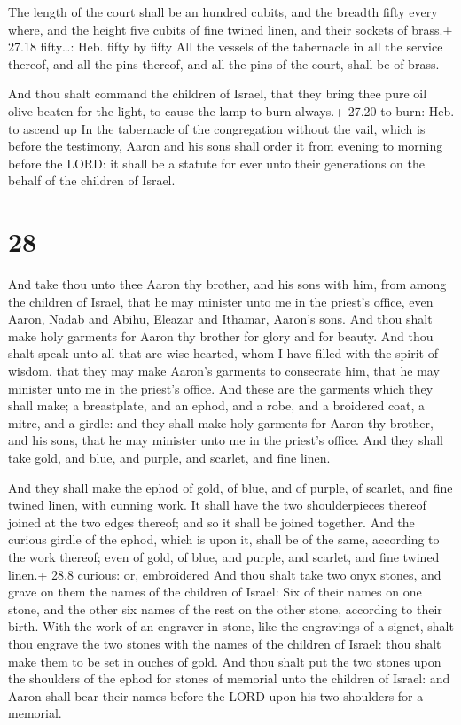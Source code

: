  The length of the court shall be an hundred cubits, and
the breadth fifty every where, and the height five cubits of fine twined
linen, and their sockets of brass.+ 27.18 fifty\ldots: Heb. fifty by
fifty  All the vessels of the tabernacle in all the service
thereof, and all the pins thereof, and all the pins of the court, shall
be of brass.

 And thou shalt command the children of Israel, that they
bring thee pure oil olive beaten for the light, to cause the lamp to
burn always.+ 27.20 to burn: Heb. to ascend up  In the
tabernacle of the congregation without the vail, which is before the
testimony, Aaron and his sons shall order it from evening to morning
before the LORD: it shall be a statute for ever unto their generations
on the behalf of the children of Israel.

\hypertarget{section-27}{%
\section{28}\label{section-27}}

 And take thou unto thee Aaron thy brother, and his sons
with him, from among the children of Israel, that he may minister unto
me in the priest's office, even Aaron, Nadab and Abihu, Eleazar and
Ithamar, Aaron's sons.  And thou shalt make holy garments
for Aaron thy brother for glory and for beauty.  And thou
shalt speak unto all that are wise hearted, whom I have filled with the
spirit of wisdom, that they may make Aaron's garments to consecrate him,
that he may minister unto me in the priest's office.  And
these are the garments which they shall make; a breastplate, and an
ephod, and a robe, and a broidered coat, a mitre, and a girdle: and they
shall make holy garments for Aaron thy brother, and his sons, that he
may minister unto me in the priest's office.  And they shall
take gold, and blue, and purple, and scarlet, and fine linen.

 And they shall make the ephod of gold, of blue, and of
purple, of scarlet, and fine twined linen, with cunning work.
 It shall have the two shoulderpieces thereof joined at the
two edges thereof; and so it shall be joined together.  And
the curious girdle of the ephod, which is upon it, shall be of the same,
according to the work thereof; even of gold, of blue, and purple, and
scarlet, and fine twined linen.+ 28.8 curious: or, embroidered
 And thou shalt take two onyx stones, and grave on them the
names of the children of Israel:  Six of their names on one
stone, and the other six names of the rest on the other stone, according
to their birth.  With the work of an engraver in stone,
like the engravings of a signet, shalt thou engrave the two stones with
the names of the children of Israel: thou shalt make them to be set in
ouches of gold.  And thou shalt put the two stones upon the
shoulders of the ephod for stones of memorial unto the children of
Israel: and Aaron shall bear their names before the LORD upon his two
shoulders for a memorial.

